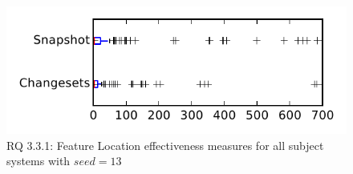 
\begin{figure}
\centering
\includegraphics[height=0.4\textheight]{figures/flt_seed/rq1_tiny_13}
\caption{RQ 3.3.1: Feature Location effectiveness measures for all subject systems with $seed=13$}
\label{fig:flt_seed:rq1:tiny}
\end{figure}
